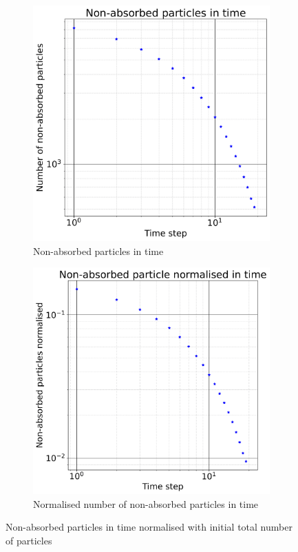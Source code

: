 \documentclass{article}
\begin{document}
\begin{figure}[htbp]
    \centering
    \begin{subfigure}[b]{0.45\textwidth}
        \centering
        \includegraphics[width=\textwidth]{images/nonAbsParticles.png}
        \caption{Non-absorbed particles in time}
        \label{fig:subplotNonAbsPart}
    \end{subfigure}
    \hfill
    \begin{subfigure}[b]{0.45\textwidth}
        \centering
        \includegraphics[width=\textwidth]{images/nonAbsParticlesNorm.png}
        \caption{Normalised number of non-absorbed particles in time}
        \label{fig:subplotNonAbsPartNorm}
    \end{subfigure}
    \caption{Non-absorbed particles in time normalised with initial total number of particles}
    \label{fig:AbsorptionInTime}
\end{figure}
\end{document}
